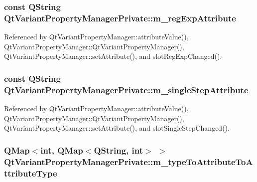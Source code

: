 \subsubsection[{m\+\_\+reg\+Exp\+Attribute}]{\setlength{\rightskip}{0pt plus 5cm}const Q\+String Qt\+Variant\+Property\+Manager\+Private\+::m\+\_\+reg\+Exp\+Attribute}\label{classQtVariantPropertyManagerPrivate_a3c28ea856ced9bb06f9fe4c838dc60fe}


Referenced by Qt\+Variant\+Property\+Manager\+::attribute\+Value(), Qt\+Variant\+Property\+Manager\+::\+Qt\+Variant\+Property\+Manager(), Qt\+Variant\+Property\+Manager\+::set\+Attribute(), and slot\+Reg\+Exp\+Changed().

\subsubsection[{m\+\_\+single\+Step\+Attribute}]{\setlength{\rightskip}{0pt plus 5cm}const Q\+String Qt\+Variant\+Property\+Manager\+Private\+::m\+\_\+single\+Step\+Attribute}\label{classQtVariantPropertyManagerPrivate_a56896137f814af8e520c18164c3fa9cc}


Referenced by Qt\+Variant\+Property\+Manager\+::attribute\+Value(), Qt\+Variant\+Property\+Manager\+::\+Qt\+Variant\+Property\+Manager(), Qt\+Variant\+Property\+Manager\+::set\+Attribute(), and slot\+Single\+Step\+Changed().

\subsubsection[{m\+\_\+type\+To\+Attribute\+To\+Attribute\+Type}]{\setlength{\rightskip}{0pt plus 5cm}Q\+Map$<$int, Q\+Map$<$Q\+String, int$>$ $>$ Qt\+Variant\+Property\+Manager\+Private\+::m\+\_\+type\+To\+Attribute\+To\+Attribute\+Type}\label{classQtVariantPropertyManagerPrivate_a8be9345c12b45eb14e4582f18eaae1d1}


